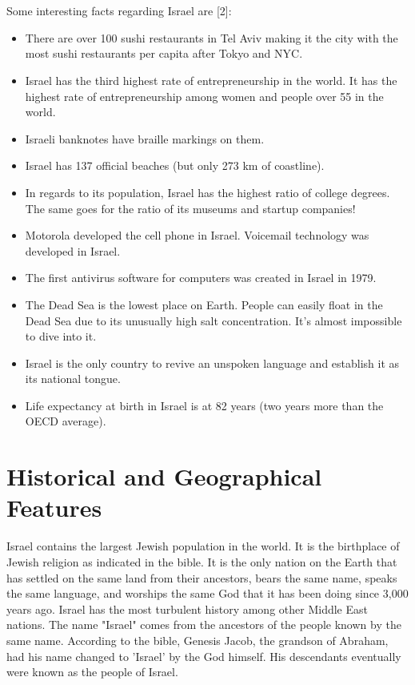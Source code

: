 \documentclass[10pt]{article}
\begin{document}
\\
\\
Some interesting facts regarding Israel are [2]:
\begin{itemize}
	\item There are over 100 sushi restaurants in Tel Aviv making it the city with the most sushi restaurants per capita after Tokyo and NYC.
	\item Israel has the third highest rate of entrepreneurship in the world. It has the highest rate of entrepreneurship among women and people over 55 in the world.
	\item Israeli banknotes have braille markings on them.
	\item Israel has 137 official beaches (but only 273 km of coastline).
	\item In regards to its population, Israel has the highest ratio of college degrees. The same goes for the ratio of its museums and startup companies!
	\item Motorola developed the cell phone in Israel. Voicemail technology was developed in Israel.
	\item The first antivirus software for computers was created in Israel in 1979.
	\item The Dead Sea is the lowest place on Earth. People can easily float in the Dead Sea due to its unusually high salt concentration. It's almost impossible to dive into it.
	\item Israel is the only country to revive an unspoken language and establish it as its national tongue.
	\item Life expectancy at birth in Israel is at 82 years (two years more than the OECD average).
\end{itemize}

\section{Historical and Geographical Features}
Israel contains the largest Jewish population in the world. It is the birthplace of Jewish religion as indicated in the bible. It is the only nation on the Earth that has settled on the same land from their ancestors, bears the same name, speaks the same language, and worships the same God that it has been doing since 3,000 years ago. Israel has the most turbulent history among other Middle East nations. The name "Israel" comes from the ancestors of the people known by the same name. According to the bible, Genesis Jacob, the grandson of Abraham, had his name changed to 'Israel' by the God himself. His descendants eventually were  known as the people of Israel.
\end{document}
